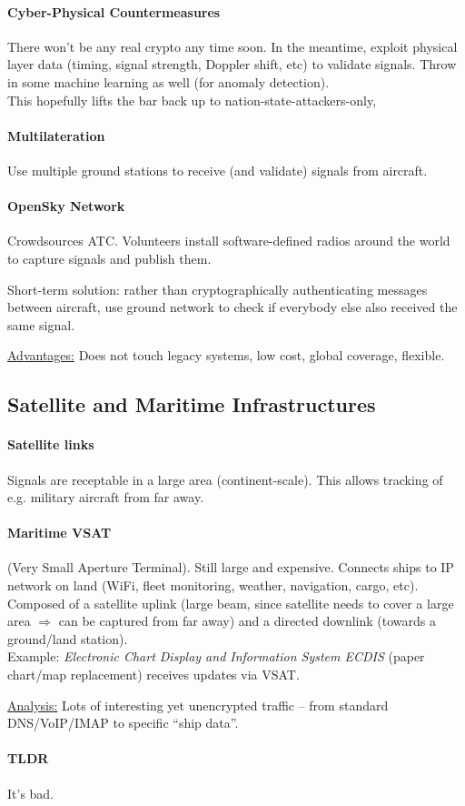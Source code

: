 \paragraph{Cyber-Physical Countermeasures}
There won't be any real crypto any time soon.
In the meantime, exploit physical layer data (timing, signal strength, Doppler shift, etc) to validate signals.
Throw in some machine learning as well (for anomaly detection).
\\
This hopefully lifts the bar back up to nation-state-attackers-only,

\paragraph{Multilateration}
Use multiple ground stations to receive (and validate) signals from aircraft.

\paragraph{OpenSky Network}
Crowdsources ATC.
Volunteers install software-defined radios around the world to capture signals and publish them.

Short-term solution: rather than cryptographically authenticating messages between aircraft, use ground network to check if everybody else also received the same signal.

\underline{Advantages:}
Does not touch legacy systems, low cost, global coverage, flexible.



\subsection{Satellite and Maritime Infrastructures}

\paragraph{Satellite links}
Signals are receptable in a large area (continent-scale).
This allows tracking of e.g. military aircraft from far away.

\paragraph{Maritime VSAT} (Very Small Aperture Terminal). Still large and expensive.
Connects ships to IP network on land (WiFi, fleet monitoring, weather, navigation, cargo, etc).
Composed of a satellite uplink (large beam, since satellite needs to cover a large area $\Rightarrow$ can be captured from far away) and a directed downlink (towards a ground/land station).
\\
Example: \textit{Electronic Chart Display and Information System ECDIS} (paper chart/map replacement) receives updates via VSAT.

\underline{Analysis:}
Lots of interesting yet unencrypted traffic -- from standard DNS/VoIP/IMAP to specific ``ship data''.

\paragraph{TLDR} It's bad.

